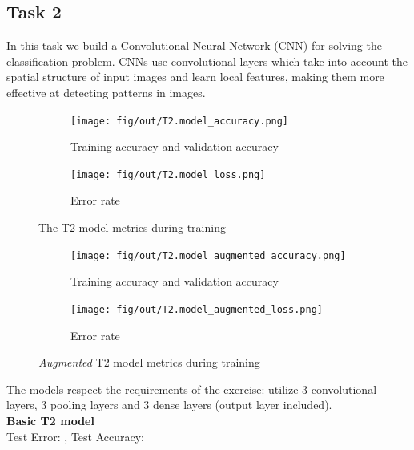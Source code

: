 \documentclass[tikz,14pt,fleqn]{article}
\begin{document}
\subsection{Task 2}
 In this task we build a Convolutional Neural Network (CNN) for solving the classification problem. CNNs use convolutional layers which take into account the spatial structure of input images and learn local features, making them more effective at detecting patterns in images.\\
 \begin{figure}[h!]
    \begin{subfigure}[t]{.49\linewidth}
      \centering
      \texttt{[image: fig/out/T2.model\_accuracy.png]}
      \caption{Training accuracy and validation accuracy}
    \end{subfigure}
    \begin{subfigure}[t]{.49\linewidth}
        \centering
        \texttt{[image: fig/out/T2.model\_loss.png]}
        \caption{Error rate}
    \end{subfigure}      
    \caption{The T2 model metrics during training}
    \label{fig:t2.metrics}
    \vspace{-0.5cm}
\end{figure}
\begin{figure}[h!]
    \begin{subfigure}[t]{.49\linewidth}
      \centering
      \texttt{[image: fig/out/T2.model\_augmented\_accuracy.png]}
      \caption{Training accuracy and validation accuracy}
      \label{fig:t2-augmented.accuracy}
    \end{subfigure}
    \begin{subfigure}[t]{.49\linewidth}
        \centering
        \texttt{[image: fig/out/T2.model\_augmented\_loss.png]}
        \caption{Error rate}
    \end{subfigure}      
    \caption{\textit{Augmented} T2 model metrics during training}
    \label{fig:t2-augmented.metrics}
    \vspace{-0.5cm}
\end{figure}

The models respect the requirements of the exercise: utilize 3 convolutional layers, 3 pooling layers and 3 dense layers (output layer included).\\

\textbf{Basic T2 model}\\
Test Error: \textbf{}, Test Accuracy: \textbf{}
\end{document}
